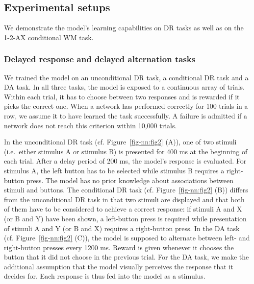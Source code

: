\documentclass[
  11pt,
  a4paper,
]{scrbook}
\begin{document}
\subsection{Experimental setups}\label{sec-nn:setup}

We demonstrate the model's learning capabilities on DR tasks as well as
on the 1-2-AX conditional WM task.

\subsubsection*{Delayed response and delayed alternation
tasks}\label{delayed-response-and-delayed-alternation-tasks}

We trained the model on an unconditional DR task, a conditional DR task
and a DA task. In all three tasks, the model is exposed to a continuous
array of trials. Within each trial, it has to choose between two
responses and is rewarded if it picks the correct one. When a network
has performed correctly for 100 trials in a row, we assume it to have
learned the task successfully. A failure is admitted if a network does
not reach this criterion within 10,000 trials.

In the unconditional DR task (cf. Figure~\ref{fig-nn:fig2} (A)), one of
two stimuli (i.e.~either stimulus A or stimulus B) is presented for 400
ms at the beginning of each trial. After a delay period of 200 ms, the
model's response is evaluated. For stimulus A, the left button has to be
selected while stimulus B requires a right-button press. The model has
no prior knowledge about associations between stimuli and buttons. The
conditional DR task (cf. Figure~\ref{fig-nn:fig2} (B)) differs from the
unconditional DR task in that two stimuli are displayed and that both of
them have to be considered to achieve a correct response: if stimuli A
and X (or B and Y) have been shown, a left-button press is required
while presentation of stimuli A and Y (or B and X) requires a
right-button press. In the DA task (cf. Figure~\ref{fig-nn:fig2} (C)),
the model is supposed to alternate between left- and right-button
presses every 1200 ms. Reward is given whenever it chooses the button
that it did not choose in the previous trial. For the DA task, we make
the additional assumption that the model visually perceives the response
that it decides for. Each response is thus fed into the model as a
stimulus.
\end{document}
